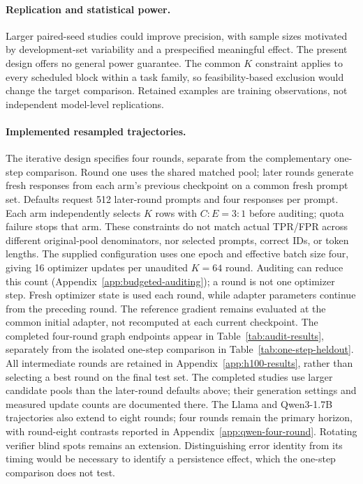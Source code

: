 \paragraph{Replication and statistical power.}
Larger paired-seed studies could improve precision, with sample sizes
motivated by development-set variability and a prespecified meaningful
effect. The present design offers no general power guarantee. The common
$K$ constraint applies to every scheduled block within a task family, so
feasibility-based exclusion would change the target comparison. Retained
examples are training observations, not independent model-level replications.

\paragraph{Implemented resampled trajectories.}
The iterative design specifies four rounds, separate from
the complementary one-step comparison. Round one uses the shared matched pool;
later rounds generate fresh responses from each arm's previous checkpoint
on a common fresh prompt set. Defaults request 512 later-round prompts and
four responses per prompt. Each arm independently selects $K$ rows with
$C:E=3:1$ before auditing; quota failure stops that arm. These constraints
do not match actual TPR/FPR across different original-pool denominators,
nor selected prompts, correct IDs, or token lengths. The supplied configuration
uses one epoch and effective batch size four, giving 16 optimizer updates
per unaudited $K=64$ round. Auditing can reduce this count
(Appendix~\ref{app:budgeted-auditing}); a round is not one optimizer step.
Fresh optimizer state is used each round, while adapter parameters continue
from the preceding round. The reference gradient remains evaluated at the
common initial adapter, not recomputed at each current checkpoint.
The completed four-round graph endpoints appear in
Table~\ref{tab:audit-results}, separately from the isolated one-step
comparison in Table~\ref{tab:one-step-heldout}. All intermediate rounds are retained in
Appendix~\ref{app:h100-results}, rather than selecting a best round on
the final test set. The completed studies use larger candidate pools than
the later-round defaults above; their generation settings and measured
update counts are documented there. The Llama and Qwen3-1.7B trajectories
also extend to eight rounds; four rounds remain the primary horizon,
with round-eight contrasts reported in Appendix~\ref{app:qwen-four-round}.
Rotating verifier blind spots
remains an extension. Distinguishing error identity from its timing would be necessary
to identify a persistence effect, which the one-step comparison does not test.

